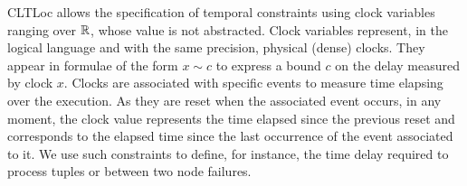 CLTLoc allows the specification of temporal constraints using clock variables ranging over $\mathbb{R}$, whose value is not abstracted.
Clock variables represent, in the logical language and with the same precision, physical (dense) clocks.
They appear in formulae of the form $x \sim c$ to express a bound $c$ on the delay measured by clock $x$. 
Clocks are associated with specific events to measure time elapsing over the execution.
As they are reset when the associated event occurs, in any moment, the clock value represents the time elapsed since the previous reset and corresponds to the elapsed time since the last occurrence of the event associated to it.
We use such constraints to define, for instance, the time delay required to process tuples or between two node failures.



